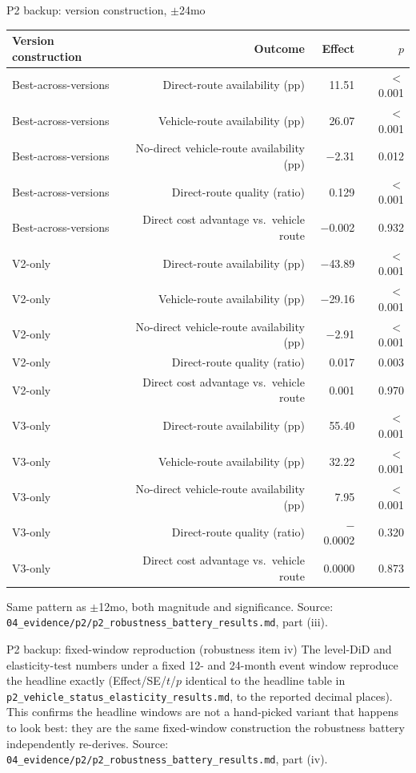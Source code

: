 \documentclass[aspectratio=169]{beamer}
\begin{document}
\begin{frame}{P2 backup: version construction, $\pm$24mo}
  \tiny
  \begin{center}
  \begin{tabular}{@{}l r r r@{}}
    \toprule
    Version construction & Outcome & Effect & $p$ \\
    \midrule
    Best-across-versions & Direct-route availability (pp) & 11.51 & $<$0.001 \\
    Best-across-versions & Vehicle-route availability (pp) & 26.07 & $<$0.001 \\
    Best-across-versions & No-direct vehicle-route availability (pp) & $-$2.31 & 0.012 \\
    Best-across-versions & Direct-route quality (ratio) & 0.129 & $<$0.001 \\
    Best-across-versions & Direct cost advantage vs.\ vehicle route & $-$0.002 & 0.932 \\
    V2-only & Direct-route availability (pp) & $-$43.89 & $<$0.001 \\
    V2-only & Vehicle-route availability (pp) & $-$29.16 & $<$0.001 \\
    V2-only & No-direct vehicle-route availability (pp) & $-$2.91 & $<$0.001 \\
    V2-only & Direct-route quality (ratio) & 0.017 & 0.003 \\
    V2-only & Direct cost advantage vs.\ vehicle route & 0.001 & 0.970 \\
    V3-only & Direct-route availability (pp) & 55.40 & $<$0.001 \\
    V3-only & Vehicle-route availability (pp) & 32.22 & $<$0.001 \\
    V3-only & No-direct vehicle-route availability (pp) & 7.95 & $<$0.001 \\
    V3-only & Direct-route quality (ratio) & $-$0.0002 & 0.320 \\
    V3-only & Direct cost advantage vs.\ vehicle route & 0.0000 & 0.873 \\
    \bottomrule
  \end{tabular}
  \end{center}
  \vspace{0.3em}
  \tiny Same pattern as $\pm$12mo, both magnitude and significance. Source: \texttt{04\_evidence/p2/p2\_robustness\_battery\_results.md}, part (iii).
\end{frame}

\begin{frame}{P2 backup: fixed-window reproduction (robustness item iv)}
  \footnotesize
  The level-DiD and elasticity-test numbers under a fixed 12- and 24-month event window reproduce the headline exactly (Effect/SE/$t$/$p$ identical to the headline table in \texttt{p2\_vehicle\_status\_elasticity\_results.md}, to the reported decimal places). This confirms the headline windows are not a hand-picked variant that happens to look best: they are the same fixed-window construction the robustness battery independently re-derives.
  {\scriptsize Source: \texttt{04\_evidence/p2/p2\_robustness\_battery\_results.md}, part (iv).}
\end{frame}
\end{document}
